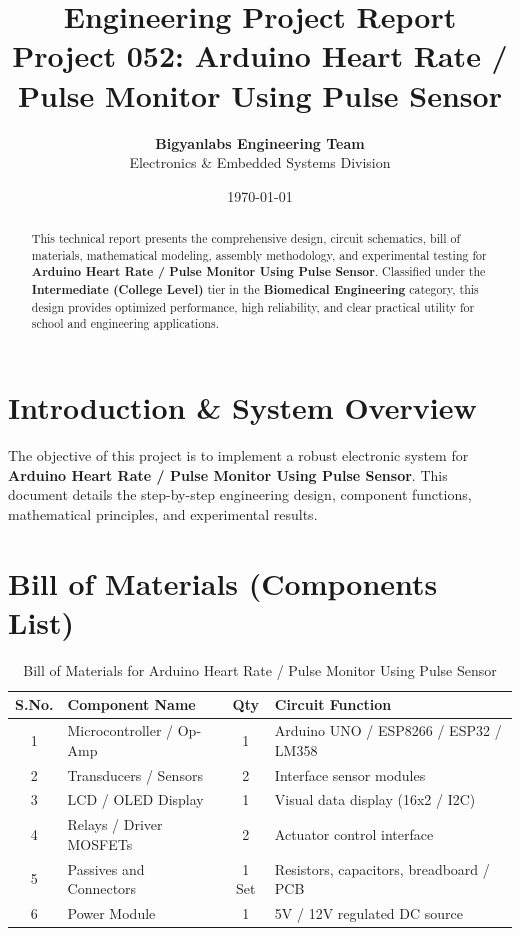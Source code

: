 \documentclass[11pt,a4paper]{article}
\title{\textbf{\Huge Engineering Project Report}\\[0.5em] \Large Project 052: Arduino Heart Rate / Pulse Monitor Using Pulse Sensor}
\author{\textbf{Bigyanlabs Engineering Team}\\ Electronics \& Embedded Systems Division}
\date{\today}
\begin{document}
\maketitle
\thispagestyle{empty}

\begin{abstract}
This technical report presents the comprehensive design, circuit schematics, bill of materials, mathematical modeling, assembly methodology, and experimental testing for \textbf{Arduino Heart Rate / Pulse Monitor Using Pulse Sensor}. Classified under the \textbf{Intermediate (College Level)} tier in the \textbf{Biomedical Engineering} category, this design provides optimized performance, high reliability, and clear practical utility for school and engineering applications.
\end{abstract}

\newpage
\tableofcontents
\newpage

\section{Introduction \& System Overview}
The objective of this project is to implement a robust electronic system for \textbf{Arduino Heart Rate / Pulse Monitor Using Pulse Sensor}. This document details the step-by-step engineering design, component functions, mathematical principles, and experimental results.

\section{Bill of Materials (Components List)}
\begin{table}[h!]
\centering
\caption{Bill of Materials for Arduino Heart Rate / Pulse Monitor Using Pulse Sensor}
\vspace{0.5em}
\begin{tabular}{clcp{7cm}}
\toprule
\textbf{S.No.} & \textbf{Component Name} & \textbf{Qty} & \textbf{Circuit Function} \\
\midrule
1 & Microcontroller / Op-Amp & 1 & Arduino UNO / ESP8266 / ESP32 / LM358 \\
2 & Transducers / Sensors & 2 & Interface sensor modules \\
3 & LCD / OLED Display & 1 & Visual data display (16x2 / I2C) \\
4 & Relays / Driver MOSFETs & 2 & Actuator control interface \\
5 & Passives and Connectors & 1 Set & Resistors, capacitors, breadboard / PCB \\
6 & Power Module & 1 & 5V / 12V regulated DC source \\
\bottomrule
\end{tabular}
\end{table}
\end{document}

